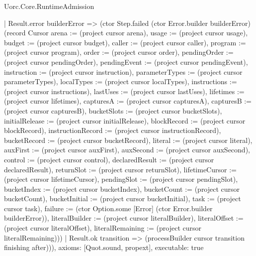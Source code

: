 \begin{lexlean}{Uorc.Core.RuntimeAdmission}
\begin{semanticmodule}
{      | Result.error builderError => (ctor Step.failed (ctor Error.builder builderError) (record Cursor {arena := (project cursor arena), usage := (project cursor usage), budget := (project cursor budget), caller := (project cursor caller), program := (project cursor program), order := (project cursor order), pendingOrder := (project cursor pendingOrder), pendingEvent := (project cursor pendingEvent), instruction := (project cursor instruction), parameterTypes := (project cursor parameterTypes), localTypes := (project cursor localTypes), instructions := (project cursor instructions), lastUses := (project cursor lastUses), lifetimes := (project cursor lifetimes), capturesA := (project cursor capturesA), capturesB := (project cursor capturesB), bucketSlots := (project cursor bucketSlots), initialRelease := (project cursor initialRelease), blockRecord := (project cursor blockRecord), instructionRecord := (project cursor instructionRecord), bucketRecord := (project cursor bucketRecord), literal := (project cursor literal), auxFirst := (project cursor auxFirst), auxSecond := (project cursor auxSecond), control := (project cursor control), declaredResult := (project cursor declaredResult), returnSlot := (project cursor returnSlot), lifetimeCursor := (project cursor lifetimeCursor), pendingSlot := (project cursor pendingSlot), bucketIndex := (project cursor bucketIndex), bucketCount := (project cursor bucketCount), bucketInitial := (project cursor bucketInitial), task := (project cursor task), failure := (ctor Option.some [Error] (ctor Error.builder builderError)), literalBuilder := (project cursor literalBuilder), literalOffset := (project cursor literalOffset), literalRemaining := (project cursor literalRemaining)}))
      | Result.ok transition => (processBuilder cursor transition finishing after))),
  axioms: [Quot.sound, propext],
  executable: true
}


\end{semanticmodule}
\end{lexlean}
